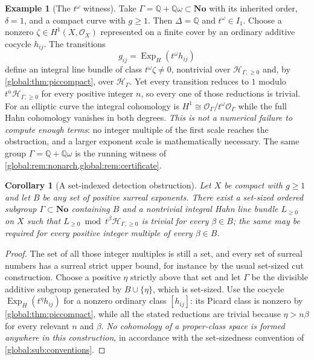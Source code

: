 \documentclass[11pt,letterpaper]{article}
\newtheorem{corollary}[corollary]{Corollary}
\theoremstyle{definition}
\newtheorem{example}[example]{Example}
\theoremstyle{remark}
\newcommand{\No}{\mathbf{No}}
\newcommand{\Q}{\mathbb Q}
\newcommand{\OO}{\mathcal O}
\newcommand{\HH}{\mathscr H_\Gamma}
\newcommand{\HI}{\mathscr H_{\Gamma,\ge0}}
\newcommand{\ExpH}{\operatorname{Exp}_{H}}
\numberwithin{equation}{section}
\begin{document}
\begin{example}[The $t^\omega$ witness]\label{global:ex:tomega}
Take $\Gamma=\Q+\Q\omega\subset\No$ with its inherited order, $\delta=1$, and a compact curve with $g\ge1$. Then $\Delta=\Q$ and $t^\omega\in I_1$. Choose a nonzero $\zeta\in H^1(X,\OO_X)$ represented on a finite cover by an ordinary additive cocycle $h_{ij}$. The transitions
\begin{equation}\label{global:eq:invisiblebundle}
  g_{ij}=\ExpH(t^\omega h_{ij})
\end{equation}
define an integral line bundle of class $t^\omega\zeta\ne0$, nontrivial over $\HI$ and, by \cref{global:thm:piccompact}, over $\HH$. Yet every transition reduces to $1$ modulo $t^n\HI$ for every positive integer $n$, so every one of those reductions is trivial. For an elliptic curve the integral cohomology is $H^1\cong\OO_\Gamma/t^\omega\OO_\Gamma$ while the full Hahn cohomology vanishes in both degrees. \emph{This is not a numerical failure to compute enough terms}: no integer multiple of the first scale reaches the obstruction, and a larger exponent scale is mathematically necessary. The same group $\Gamma=\Q+\Q\omega$ is the running witness of \cref{global:rem:nonarch,global:rem:certificate}.
\end{example}

\begin{corollary}[A set-indexed detection obstruction]\label{global:cor:setcutoffs}
Let $X$ be compact with $g\ge1$ and let $B$ be \emph{any} set of positive surreal exponents. There exist a set-sized ordered subgroup $\Gamma\subset\No$ containing $B$ and a nontrivial integral Hahn line bundle $L_{\ge0}$ on $X$ such that $L_{\ge0}\bmod t^\beta\HI$ is trivial for every $\beta\in B$; the same may be required for every positive integer multiple of every $\beta\in B$.
\end{corollary}

\begin{proof}
The set of all those integer multiples is still a set, and every set of surreal numbers has a surreal strict upper bound, for instance by the usual set-sized cut construction. Choose a positive $\eta$ strictly above that set and let $\Gamma$ be the divisible additive subgroup generated by $B\cup\{\eta\}$, which is set-sized. Use the cocycle $\ExpH(t^\eta h_{ij})$ for a nonzero ordinary class $[h_{ij}]$: its Picard class is nonzero by \cref{global:thm:piccompact}, while all the stated reductions are trivial because $\eta>n\beta$ for every relevant $n$ and $\beta$. \emph{No cohomology of a proper-class space is formed anywhere in this construction}, in accordance with the set-sizedness convention of \cref{global:sub:conventions}.
\end{proof}
\end{document}
